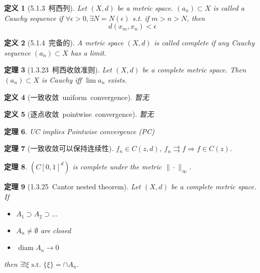 \documentclass[10pt,openany]{book}
\theoremstyle{thmstyle} %
\newtheorem{theorem}{定理}[chapter]
\theoremstyle{defstyle} %
\newtheorem{definition}[theorem]{定义}
\theoremstyle{prostyle} %
\begin{document}
\begin{definition}[5.1.3~柯西列] 
Let $(X, d)$ be a metric space. $\left(a_n\right) \subset X$ is called a Cauchy sequence if $\forall \epsilon>0, \exists N=N(\epsilon)$ s.t. if $m>n>N$, then
$$
d\left(x_m, x_n\right)<\epsilon
$$
\end{definition}

\begin{definition}[5.1.4~完备的] 
A metric space $(X, d)$ is called complete if any Cauchy sequence $\left(a_n\right) \subset X$ has a limit.
\end{definition}


\begin{theorem}[1.3.23~柯西收敛准则]
Let $(X, d)$ be a complete metric space. Then $\left(a_n\right) \subset X$ is Cauchy iff $\lim a_n$ exists.
\end{theorem}

\begin{definition}[一致收敛~uniform~convergence]
暂无
\end{definition}

\begin{definition}[逐点收敛~pointwise~convergence]
暂无
\end{definition}

\begin{theorem}
UC implies Pointwise convergence (PC)
\end{theorem}

\begin{theorem}[一致收敛可以保持连续性]
$f_n \in C(z,d),~ f_n \rightrightarrows f \Rightarrow f \in C(z)$.
\end{theorem}

\begin{theorem}
$\left(C[0,1]^d\right)$ is complete under the metric $\|\cdot\|_{\infty}$.
\end{theorem}

\begin{theorem}[1.3.25~Cantor nested theorem]
Let $(X, d)$ be a complete metric space. If
\begin{itemize}
  \item $A_1 \supset A_2 \supset \ldots$
  \item $A_n \neq \emptyset$ are closed
  \item $\operatorname{diam} A_n \rightarrow 0$
\end{itemize}
then $\exists ! \xi \text { s.t. }\{\xi\}=\cap A_n $.
\end{theorem}
\end{document}
